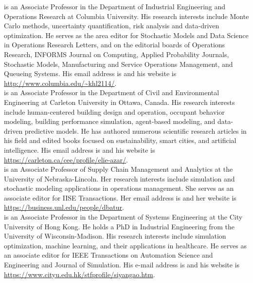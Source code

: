 \documentclass{wscpaperproc}
\theoremstyle{wsc}
\begin{document}
 is an Associate Professor in the Department of Industrial Engineering and Operations Research at Columbia University. His research interests include Monte Carlo methods, uncertainty quantification, risk analysis and data-driven optimization. He serves as the area editor for Stochastic Models and Data Science in Operations Research Letters, and on the editorial boards of Operations Research, INFORMS Journal on Computing, Applied Probability Journals, Stochastic Models, Manufacturing and Service Operations Management, and Queueing Systems. His email address is   and his website is \url{http://www.columbia.edu/~khl2114/}.\\

 is an Associate Professor in the Department of Civil and Environmental Engineering at Carleton University in Ottawa, Canada. His research interests include human-centered building design and operation, occupant behavior modeling, building performance simulation, agent-based modeling, and data-driven predictive models. He has authored numerous scientific research articles in his field and edited books focused on sustainability, smart cities, and artificial intelligence. His email address is  and his website is \url{https://carleton.ca/cee/profile/elie-azar/}.\\

 is an Associate Professor of Supply Chain Management and Analytics at the University of Nebraska-Lincoln. Her research interests include simulation and stochastic modeling applications in operations management. She serves as an associate editor for IISE Transactions. Her email address is  and her website is \url{https://business.unl.edu/people/dbatur}.\\

 is an Associate Professor in the Department of Systems Engineering at the City University of Hong Kong. He holds a PhD in Industrial Engineering from the University of Wisconsin-Madison. His research interests include simulation optimization, machine learning, and their applications in healthcare. He serves as an associate editor for IEEE Transactions on Automation Science and Engineering and Journal of Simulation. His e-mail address is  and his website is \url{https://www.cityu.edu.hk/stfprofile/siyangao.htm}.\\
\end{document}
